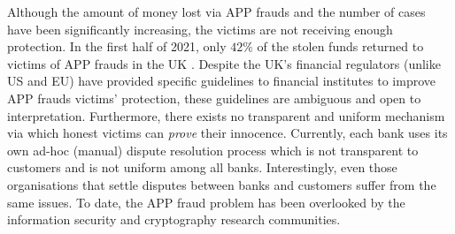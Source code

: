 %
%





Although the amount of money lost via  APP frauds and the number of cases have been significantly increasing, the victims are not receiving enough protection.  In the first half of 2021, only $42\%$ of the stolen funds returned to victims of  APP frauds in the UK \cite{2021-Half-Year-Fraud-Update}.  Despite the UK's financial regulators (unlike   US and EU) have provided specific guidelines to financial institutes to improve APP frauds victims' protection, these guidelines are ambiguous and open to interpretation. Furthermore,  there exists no transparent and uniform mechanism via which honest victims can  \emph{prove} their innocence. Currently, each bank uses its own ad-hoc (manual) dispute resolution process which is not transparent to customers and is not uniform among all banks. Interestingly, even those organisations that settle disputes between banks and customers suffer from the same issues. To date, the APP fraud problem has been overlooked by the information security and cryptography research communities.


